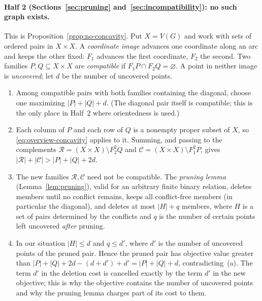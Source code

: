 \documentclass[11pt]{article}
\theoremstyle{remark}
\newcommand{\abs}[1]{\lvert #1\rvert}
\newcommand{\cR}{\mathcal R}
\newcommand{\cC}{\mathcal C}
\begin{document}
\paragraph{Half 2 (Sections~\ref{sec:pruning}
and~\ref{sec:incompatibility}): no such graph exists.}
This is Proposition~\ref{prop:no-concavity}. Put $X=V(G)$ and work with sets
of ordered pairs in $X\times X$. A \emph{coordinate image} advances one
coordinate along an arc and keeps the other fixed: $F_1$ advances the first
coordinate, $F_2$ the second. Two families $P,Q\subseteq X\times X$ are
\emph{compatible} if $F_1P\cap F_2Q=\varnothing$. A point in neither image is
\emph{uncovered}; let $d$ be the number of uncovered points.
\begin{enumerate}[label=(\alph*),leftmargin=2em]
\item Among compatible pairs with both families containing the diagonal,
choose one maximizing $\abs P+\abs Q+d$. (The diagonal pair itself is
compatible; this is the only place in Half~2 where orientedness is used.)
\item Each column of $P$ and each row of $Q$ is a nonempty proper subset of
$X$, so \eqref{eq:overview-concavity} applies to it. Summing, and passing
to the complements $\cR=(X\times X)\setminus F_2^2Q$ and
$\cC=(X\times X)\setminus F_1^2P$, gives
$\abs{\cR}+\abs{\cC}>\abs P+\abs Q+2d$.
\item The new families $\cR,\cC$ need not be compatible. The
\emph{pruning lemma} (Lemma~\ref{lem:pruning}), valid for an arbitrary
finite binary relation, deletes members until no conflict remains, keeps
all conflict-free members (in particular the diagonal), and deletes at most
$\abs H+q$ members, where $H$ is a set of pairs determined by the conflicts
and $q$ is the number of certain points left uncovered \emph{after}
pruning.
\item In our situation $\abs H\le d$ and $q\le d'$, where $d'$ is the number
of uncovered points of the pruned pair. Hence the pruned pair has objective
value greater than
$\abs P+\abs Q+2d-(d+d')+d'=\abs P+\abs Q+d$, contradicting~(a). The
term $d'$ in the deletion cost is cancelled exactly by the term $d'$ in the
new objective; this is why the objective contains the number of uncovered
points and why the pruning lemma charges part of its cost to them.
\end{enumerate}
\end{document}
